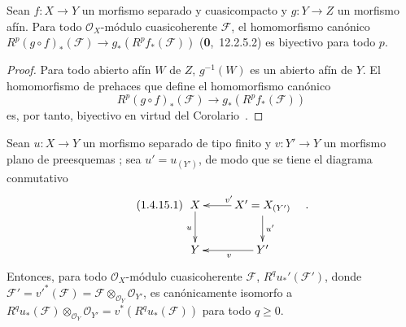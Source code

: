 \begin{proposition}[1.4.14]
\label{III.1.4.14}
\label{III.1.4.14-fr}
Sean $f:X\to Y$ un morfismo separado y cuasicompacto y $g:Y\to Z$ un morfismo afín.
Para todo $\mathcal O_X$-módulo cuasicoherente $\mathcal F$, el homomorfismo canónico $R^p(g\circ f)_*(\mathcal F)\to g_*(R^pf_*(\mathcal F))$ \textup{(\textbf{0},~12.2.5.2)} es biyectivo para todo $p$.
\end{proposition}

\begin{proof}
Para todo abierto afín $W$ de $Z$, $g^{-1}(W)$ es un abierto afín de $Y$.
El homomorfismo de prehaces que define el homomorfismo canónico
\[
R^p(g\circ f)_*(\mathcal F)\longrightarrow g_*(R^pf_*(\mathcal F))
\]
 es, por tanto, biyectivo en virtud del Corolario~.
\end{proof}

\begin{proposition}[1.4.15]
\label{III.1.4.15}
\label{III.1.4.15-fr}
Sean $u:X\to Y$ un morfismo separado de tipo finito y $v:Y'\to Y$ un morfismo plano de preesquemas ; sea $u'=u_{(Y')}$, de modo que se tiene el diagrama conmutativo
\begin{equation}
\label{III.1.4.15.1-fr}
\tag{1.4.15.1}
\xymatrix{
X\ar[d]_u & X'=X_{(Y')}\ar[l]_{v'}\ar[d]^{u'}\\
Y & Y'\ar[l]^v
}\quad.
\end{equation}
Entonces, para todo $\mathcal O_X$-módulo cuasicoherente $\mathcal F$, $R^qu_*'(\mathcal F')$, donde
$\mathcal F'=v'^*(\mathcal F)=\mathcal F\otimes_{\mathcal O_Y}\mathcal O_{Y'}$,
es canónicamente isomorfo a
$R^qu_*(\mathcal F)\otimes_{\mathcal O_Y}\mathcal O_{Y'}
=v^*(R^qu_*(\mathcal F))$ para todo $q\geq0$.
\end{proposition}


